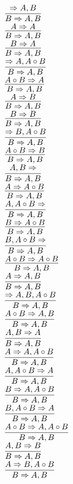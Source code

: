 \documentclass[11pt]{article}
\begin{document}
\begin{center}
\bigskip
\\$\infer{B\Rightarrow A, B}{\Rightarrow A, B}$
\bigskip
\\$\infer{B\Rightarrow A, B}{A\Rightarrow A}$
\bigskip
\\$\infer{B\Rightarrow A, B}{B\Rightarrow A}$
\bigskip
\\$\infer{B\Rightarrow A, B}{\Rightarrow A, A\circ B}$
\bigskip
\\$\infer{B\Rightarrow A, B}{A\circ B\Rightarrow A}$
\bigskip
\\$\infer{B\Rightarrow A, B}{A\Rightarrow B}$
\bigskip
\\$\infer{B\Rightarrow A, B}{B\Rightarrow B}$
\bigskip
\\$\infer{B\Rightarrow A, B}{\Rightarrow B, A\circ B}$
\bigskip
\\$\infer{B\Rightarrow A, B}{A\circ B\Rightarrow B}$
\bigskip
\\$\infer{B\Rightarrow A, B}{A, B\Rightarrow }$
\bigskip
\\$\infer{B\Rightarrow A, B}{A\Rightarrow A\circ B}$
\bigskip
\\$\infer{B\Rightarrow A, B}{A, A\circ B\Rightarrow }$
\bigskip
\\$\infer{B\Rightarrow A, B}{B\Rightarrow A\circ B}$
\bigskip
\\$\infer{B\Rightarrow A, B}{B, A\circ B\Rightarrow }$
\bigskip
\\$\infer{B\Rightarrow A, B}{A\circ B\Rightarrow A\circ B}$
\bigskip
\\$\infer{B\Rightarrow A, B}{A\Rightarrow A, B}$
\bigskip
\\$\infer{B\Rightarrow A, B}{\Rightarrow A, B, A\circ B}$
\bigskip
\\$\infer{B\Rightarrow A, B}{A\circ B\Rightarrow A, B}$
\bigskip
\\$\infer{B\Rightarrow A, B}{A, B\Rightarrow A}$
\bigskip
\\$\infer{B\Rightarrow A, B}{A\Rightarrow A, A\circ B}$
\bigskip
\\$\infer{B\Rightarrow A, B}{A, A\circ B\Rightarrow A}$
\bigskip
\\$\infer{B\Rightarrow A, B}{B\Rightarrow A, A\circ B}$
\bigskip
\\$\infer{B\Rightarrow A, B}{B, A\circ B\Rightarrow A}$
\bigskip
\\$\infer{B\Rightarrow A, B}{A\circ B\Rightarrow A, A\circ B}$
\bigskip
\\$\infer{B\Rightarrow A, B}{A, B\Rightarrow B}$
\bigskip
\\$\infer{B\Rightarrow A, B}{A\Rightarrow B, A\circ B}$

\end{center}
\end{document}
